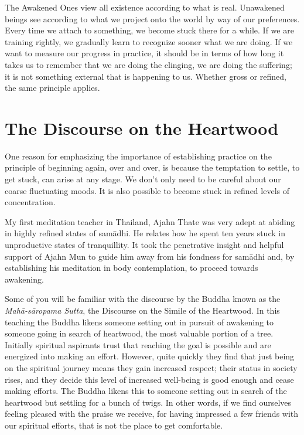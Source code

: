 The Awakened Ones view all existence according to what is real.
Unawakened beings see according to what we project onto the world by way
of our preferences. Every time we attach to something, we become stuck
there for a while. If we are training rightly, we gradually learn to
recognize sooner what we are doing. If we want to measure our progress
in practice, it should be in terms of how long it takes us to remember
that we are doing the clinging, we are doing the suffering; it is not
something external that is happening to us. Whether gross or refined,
the same principle applies.

\section{The Discourse on the Heartwood}

One reason for emphasizing the importance of establishing practice on
the principle of beginning again, over and over, is because the
temptation to settle, to get stuck, can arise at any stage. We don’t
only need to be careful about our coarse fluctuating moods. It is also
possible to become stuck in refined levels of concentration.

My first meditation teacher in Thailand, Ajahn Thate\cite{ajahn-thate}
was very adept
at abiding in highly refined states of samādhi. He relates how he spent
ten years stuck in unproductive states of tranquillity. It took the
penetrative insight and helpful support of Ajahn Mun to guide him away
from his fondness for samādhi and, by establishing his meditation in
body contemplation, to proceed towards awakening.

Some of you will be familiar with the discourse by the Buddha known as
the \emph{Mahā-sāropama Sutta},\cite{mahasaropama-sutta}
the Discourse on the Simile of the Heartwood.
In this teaching the Buddha likens someone setting out in
pursuit of awakening to someone going in search of heartwood, the most
valuable portion of a tree. Initially spiritual aspirants trust that
reaching the goal is possible and are energized into making an effort.
However, quite quickly they find that just being on the spiritual
journey means they gain increased respect; their status in society
rises, and they decide this level of increased well-being is good enough
and cease making efforts. The Buddha likens this to someone setting out
in search of the heartwood but settling for a bunch of twigs. In other
words, if we find ourselves feeling pleased with the praise we receive,
for having impressed a few friends with our spiritual efforts, that is
not the place to get comfortable.

